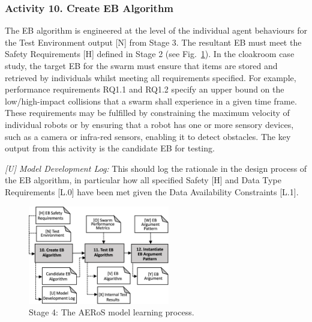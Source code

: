 \documentclass[runningheads]{llncs}
\begin{document}
\subsubsection*{Activity 10. Create EB Algorithm}

The EB algorithm is engineered at the level of the individual agent behaviours for the Test Environment output [N] from Stage 3. The resultant EB must meet the Safety Requirements [H] defined in Stage 2 (see Fig.~\ref{amlas-a-stage4}). 
In the cloakroom case study, the target EB for the swarm must ensure that items are stored and retrieved by individuals whilst meeting all requirements specified. For example, performance requirements RQ1.1 and RQ1.2 specify an upper bound on the low/high-impact collisions that a swarm shall experience in a given time frame. 
These requirements may be fulfilled by constraining the maximum velocity of individual robots or by ensuring that a robot has one or more sensory devices, such as a camera or infra-red sensors, enabling it to detect obstacles. 
The key output from this activity is the candidate EB for testing.

\emph{[U] Model Development Log:} This should log the rationale in the design process of the EB algorithm, in particular how all specified Safety [H] and Data Type Requirements [L.0] have been met given the Data Availability Constraints [L.1].

\begin{figure}[!t]
	\centering
	\includegraphics[width=0.55\textwidth]{figures/AMLAS-STAGE-4-V5.png}%
	\vspace{-2ex}
	\caption{Stage 4: The AERoS model learning process.}
	\label{amlas-a-stage4}
	\vspace{-4ex}
\end{figure}
\end{document}
